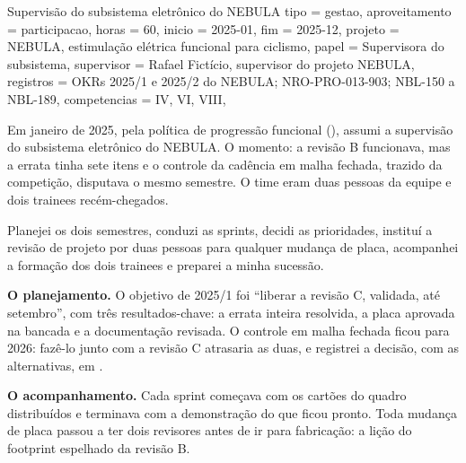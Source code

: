 \begin{atividade}{Supervisão do subsistema eletrônico do NEBULA}{
  tipo         = gestao,
  aproveitamento = participacao,
  horas        = 60,
  inicio       = 2025-01,
  fim          = 2025-12,
  projeto      = {NEBULA, estimulação elétrica funcional para ciclismo},
  papel        = {Supervisora do subsistema},
  supervisor   = {Rafael Fictício, supervisor do projeto NEBULA},
  registros    = {OKRs 2025/1 e 2025/2 do NEBULA; NRO-PRO-013-903; NBL-150 a NBL-189},
  competencias = {IV, VI, VIII},
}

\begin{contexto}
Em janeiro de 2025, pela política de progressão funcional (), assumi a supervisão
do subsistema eletrônico do NEBULA. O momento: a revisão B funcionava, mas a errata tinha sete itens e
o controle da cadência em malha fechada, trazido da competição, disputava o mesmo semestre. O time
eram duas pessoas da equipe e dois trainees recém-chegados.
\end{contexto}

\begin{contribuicao}
Planejei os dois semestres, conduzi as sprints, decidi as prioridades, instituí a revisão de projeto por
duas pessoas para qualquer mudança de placa, acompanhei a formação dos dois trainees e preparei a minha
sucessão.
\end{contribuicao}

\begin{desenvolvimento}

\textbf{O planejamento.} O objetivo de 2025/1 foi \enquote{liberar a revisão C, validada, até
setembro}, com três resultados-chave: a errata inteira resolvida, a placa aprovada na bancada e a
documentação revisada. O controle em malha fechada ficou para 2026: fazê-lo junto com a revisão C
atrasaria as duas, e registrei a decisão, com as alternativas, em .

\textbf{O acompanhamento.} Cada sprint começava com os cartões do quadro distribuídos e terminava com a
demonstração do que ficou pronto. Toda mudança de placa passou a ter dois revisores antes de ir para
fabricação: a lição do footprint espelhado da revisão B.


\end{desenvolvimento}
\end{atividade}
